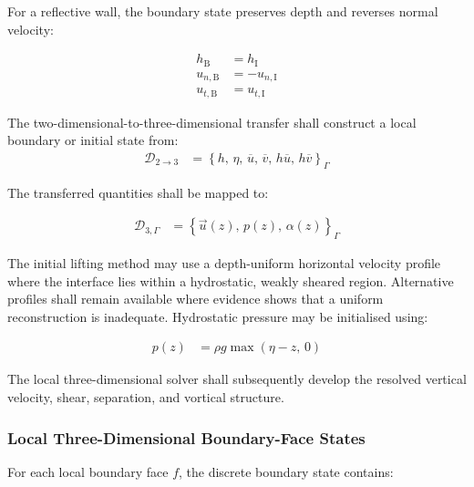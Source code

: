 For a reflective wall, the boundary state preserves depth and reverses
normal velocity:

\begin{align}
  h_{\mathrm{B}}
  &=
  h_{\mathrm{I}}
  \label{eq:res-num-ibc-regional-reflective-depth}
  \\
  u_{n,\mathrm{B}}
  &=
  -u_{n,\mathrm{I}}
  \label{eq:res-num-ibc-regional-reflective-normal-velocity}
  \\
  u_{t,\mathrm{B}}
  &=
  u_{t,\mathrm{I}}
  \label{eq:res-num-ibc-regional-reflective-tangential-velocity}
\end{align}

The two-dimensional-to-three-dimensional transfer shall construct a local boundary or initial state from:
\begin{align}
    \mathcal{D}_{2\rightarrow3} &= \left\{ h,\, \eta,\, \overline{u},\, \overline{v},\, h\overline{u},\, h\overline{v} \right\}_{\Gamma}
    \label{eq:res-num-ibc-two-to-three-data}
\end{align}

The transferred quantities shall be mapped to:

\begin{align}
    \mathcal{D}_{3,\Gamma} &= \left\{ \vec{u}(z),\, p(z),\, \alpha(z) \right\}_{\Gamma}
    \label{eq:res-num-ibc-three-dimensional-interface-data}
\end{align}

The initial lifting method may use a depth-uniform horizontal velocity profile where the interface lies within a hydrostatic, weakly sheared region. Alternative profiles shall remain available where evidence shows that a uniform reconstruction is inadequate. Hydrostatic pressure may be initialised using:

\begin{align}
    p(z) &= \rho g \max \left( \eta-z,\, 0 \right)
    \label{eq:res-num-ibc-hydrostatic-pressure-lifting}
\end{align}

The local three-dimensional solver shall subsequently develop the resolved vertical velocity, shear, separation, and vortical structure.

\subsubsection{Local Three-Dimensional Boundary-Face States}
\label{sec:res-num-ibc-local-boundary-face-states}

For each local boundary face $f$, the discrete boundary state contains:

